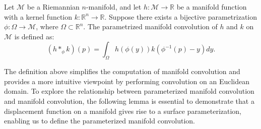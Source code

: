 \begin{definition}
    Let $\mathcal{M}$ be a Riemannian $n$-manifold, and let $h: \mathcal{M} \to \mathbb{R}$ be a manifold function with a kernel function $k: \mathbb{R}^{n}\to \mathbb{R}$. Suppose there exists a bijective parametrization $\phi:\Omega \to \mathcal{M}$, where $\Omega \subset \mathbb{R}^n$. The parametrized manifold convolution of $h$ and $k$ on $\mathcal{M}$ is defined as:
    \begin{equation}
        (h *_\phi k)(p) = \int_\Omega h(\phi(y))k(\phi^{-1}(p)-y)dy.
    \end{equation}
    
    
    \label{them:parameterconv}
\end{definition}

The definition above simplifies the computation of manifold convolution and provides a more intuitive viewpoint by performing convolution on an Euclidean domain. To explore the relationship between parameterized manifold convolution and manifold convolution, the following lemma is essential to demonstrate that a displacement function on a manifold gives rise to a surface parameterization, enabling us to define the parameterized manifold convolution.




